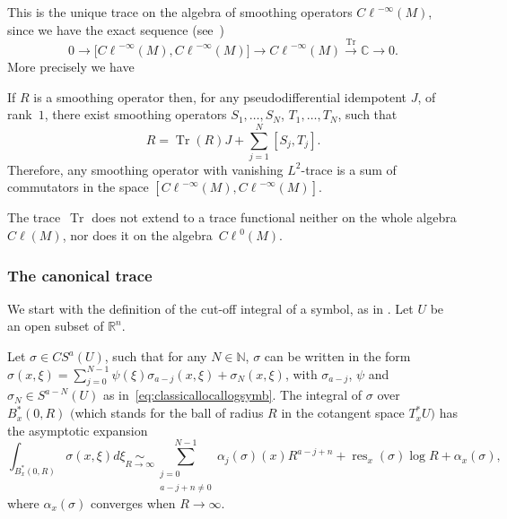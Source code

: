 \documentclass[pdftex]{sigma}
\DeclareMathOperator{\res}{res} \DeclareMathOperator{\Res}{Res}
\DeclareMathOperator{\Tr}{Tr} \DeclareMathOperator{\ord}{ord}
\def \Cl {{C\ell}}
\begin{document}
This is the unique trace on the algebra of smoothing operators $\Cl^{-\infty}(M)$, since we have the exact sequence (see~\cite{guilleminfourier})
\[
0\to\big[\Cl^{-\infty}(M),\Cl^{-\infty}(M)\big]\to \Cl^{-\infty}(M)\overset{\Tr}{\longrightarrow}\mathbb{C}\to0.
\]
More precisely we have

\begin{theorem}\label{smooth}
If $R$ is a smoothing operator then, for any pseudodifferential idempotent $J$, of rank~$1$, there exist smoothing operators $S_1,\ldots,S_{N}$, $T_1,\ldots,T_{N}$, such that
\[
R=\Tr(R)J+\sum_{j=1}^{N}[S_j,T_j].
\]
Therefore, any smoothing operator with vanishing $L^2$-trace is a sum of commutators in the space $[\Cl^{-\infty}(M),\Cl^{-\infty}(M)]$.
\end{theorem}

\begin{proposition}\label{nocont}
The trace~$\Tr$ does not extend to a trace functional neither on the whole algebra $\Cl(M)$, nor does it on the algebra~$\Cl^0(M)$.
\end{proposition}

\subsubsection{The canonical trace}\label{subsectioncanonicaltrace}

We start with the def\/inition of the cut-of\/f integral of a symbol, as in \cite{sylvie}. Let $U$ be an open subset of $\mathbb{R}^n$.

\begin{proposition}
Let $\sigma\in CS^a(U)$, such that for any $N\in\mathbb{N}$, $\sigma$ can be written in the form $ \sigma(x,\xi) =\sum\limits_{j=0}^{N-1}\psi(\xi)\sigma_{a-j}(x,\xi)+\sigma_N(x,\xi)$, with $\sigma_{a-j}$, $\psi$ and $\sigma_N\in S^{a-N}(U)$ as in~\eqref{eq:classicallocallogsymb}. The integral of $\sigma$ over $B^{*}_x(0,R)$ $($which stands for the ball of radius $R$ in the cotangent space $T^{*}_xU)$ has the asymptotic expansion
\[
\int_{B^{*}_x(0,R)}\sigma(x,\xi)d\xi \underset{R\to\infty}{\sim}\sum_{\substack{j=0\\ a-j+n\not=0}}^{N-1}\alpha_j(\sigma)(x)R^{a-j+n} +\res_x(\sigma)\log R+\alpha_x(\sigma),
\]
where $\alpha_x(\sigma)$ converges when $R\to\infty$.
\end{proposition}
\end{document}

